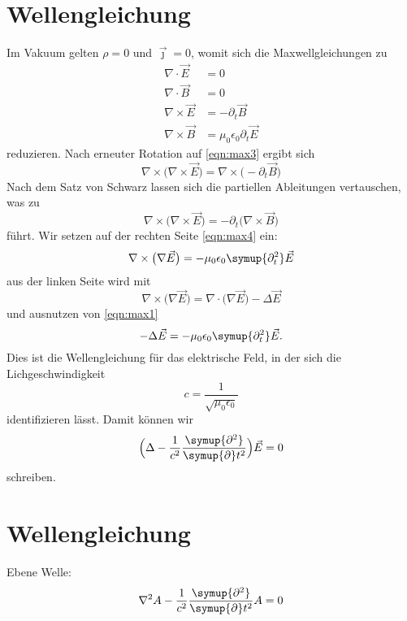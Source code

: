 \documentclass {scrartcl}
\newcommand{\be}{\begin{equation}} %
\newcommand{\ee}{\end{equation}} %
\begin{document}
\section{Wellengleichung}
Im Vakuum gelten $\rho=0$ und $\vec{\jmath}=0$, womit sich die Maxwellgleichungen
zu
\begin{align}
  \nabla\cdot\vec{E}&=0 \label{eqn:max1} \\
  \nabla\cdot\vec{B}&=0 \label{eqn:max2} \\
  \nabla\times\vec{E}&=-\partial_t\vec{B} \label{eqn:max3} \\
  \nabla\times\vec{B}&=\mu_0\epsilon_0\partial_t\vec{E} \label{eqn:max4}
\end{align}
reduzieren. Nach erneuter Rotation auf \eqref{eqn:max3} ergibt sich
\be
\nabla\times\bigl(\nabla\times\vec{E}\bigr)=\nabla\times\bigl(-\partial_t\vec{B}\bigr)
\label{eqn:rot}
\ee
Nach dem Satz von Schwarz lassen sich die partiellen Ableitungen vertauschen, was zu
\be
\nabla\times\bigl(\nabla\times\vec{E}\bigr)=-\partial_t\bigl(\nabla\times\vec{B}\bigr)
\label{eqn:schwarz}
\ee
führt. Wir setzen auf der rechten Seite \eqref{eqn:max4} ein:
\be
\nabla\times\bigl(\nabla\vec{E}\bigr)=-\mu_0\epsilon_0\symup{\partial_t^2}\vec{E}\label{eqn:ein}
\ee
aus der linken Seite wird mit
\be
\nabla\times\bigl(\nabla\vec{E}\bigr)=\nabla\cdot\bigl(\nabla\vec{E}\bigr)-\Delta
\vec{E} \label{eqn:2}
\ee
\newpage
und ausnutzen von \eqref{eqn:max1}
\be
-\Delta\vec{E}=-\mu_0\epsilon_0\symup{\partial_t^2}\vec{E}.
\label{eqn:13}
\ee
Dies ist die Wellengleichung für das elektrische Feld,
in der sich die Lichgeschwindigkeit
\be
c=\frac{1}{\sqrt{\mu_0\epsilon_0}}\label{eqn:14}
\ee
identifizieren lässt. Damit können wir
\be
\Bigl(\Delta-\frac{1}{c^2}\frac{\symup{\partial^2}}{\symup{\partial}t^2}\Bigr)
\vec{E}=0 \label{eqn:15}
\ee
schreiben.
\section{Wellengleichung}
Ebene Welle:
\be
\nabla^2 A -\frac{1}{c^2}\frac{\symup{\partial^2}}{\symup{\partial}t^2}A=0
\ee
\end{document}
